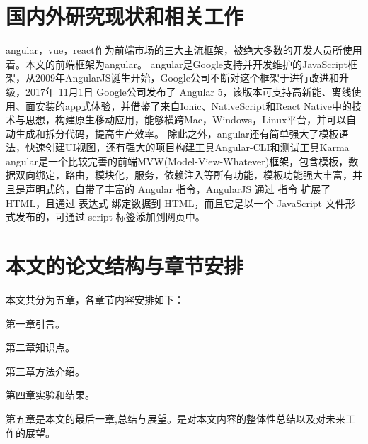 \section{国内外研究现状和相关工作}
\label{sec:related_work}
angular，vue，react作为前端市场的三大主流框架，被绝大多数的开发人员所使用着。本文的前端框架为angular。
angular是Google支持并开发维护的JavaScript框架，从2009年AngularJS诞生开始，Google公司不断对这个框架于进行改进和升级，2017年 11月1日 Google公司发布了 Angular 5，该版本可支持高新能、离线使用、面安装的app式体验，并借鉴了来自Ionic、NativeScript和React Native中的技术与思想，构建原生移动应用，能够横跨Mac，Windows，Linux平台，并可以自动生成和拆分代码，提高生产效率。
除此之外，angular还有简单强大了模板语法，快速创建UI视图，还有强大的项目构建工具Angular-CLI和测试工具Karma
angular是一个比较完善的前端MVW(Model-View-Whatever)框架，包含模板，数据双向绑定，路由，模块化，服务，依赖注入等所有功能，模板功能强大丰富，并且是声明式的，自带了丰富的 Angular 指令，AngularJS 通过 指令 扩展了 HTML，且通过 表达式 绑定数据到 HTML，而且它是以一个 JavaScript 文件形式发布的，可通过 script 标签添加到网页中。
\section{本文的论文结构与章节安排}

\label{sec:arrangement}
本文共分为五章，各章节内容安排如下：

第一章引言。

第二章知识点。

第三章方法介绍。

第四章实验和结果。

第五章是本文的最后一章,总结与展望。是对本文内容的整体性总结以及对未来工作的展望。

